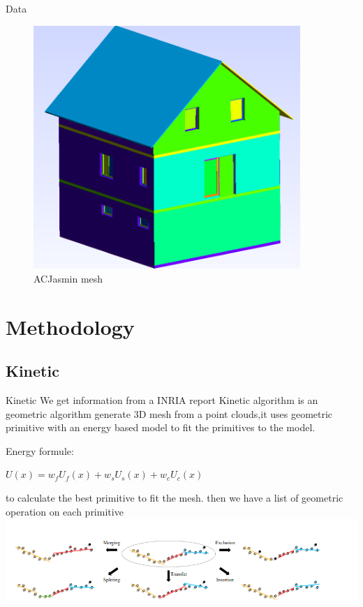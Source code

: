 \documentclass[10pt]{beamer}
\begin{document}
\begin{frame}{Data}
\begin{figure}
\begin{minipage}{0.33\textwidth}
        \end{minipage}
        \begin{minipage}{0.33\textwidth}
            \centering
            \includegraphics[width=0.9\textwidth]{../image/ACJasmin.png}
        \end{minipage}
        \caption{ACJasmin mesh}
    \end{figure}
\end{frame}


\section{Methodology}
\subsection{Kinetic}
\begin{frame}{Kinetic}
We get information from a INRIA report \cite{yu:hal-03767910}
Kinetic algorithm is an geometric algorithm generate 3D mesh from a point clouds,it uses  geometric primitive with an energy based model to fit the primitives to the model.

Energy formule: 
\newline
\begin{center}
    $        U(x) = w_f U_f(x) + w_s U_s(x) + w_c U_c(x)       $
\end{center}

to calculate the best primitive to fit the mesh.
then we have a list of geometric operation on each primitive
\includegraphics[scale=0.35]{../image/primitives_operation.png}
\end{frame}
\end{document}
